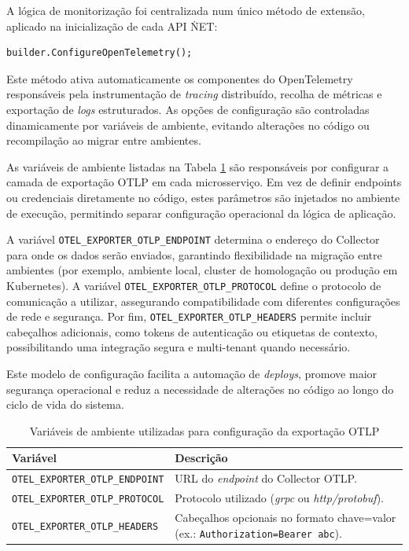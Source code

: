 A lógica de monitorização foi centralizada num único método de extensão, aplicado na inicialização de cada API \.NET:

\begin{verbatim}
builder.ConfigureOpenTelemetry();
\end{verbatim}

Este método ativa automaticamente os componentes do OpenTelemetry responsáveis pela instrumentação de \textit{tracing} distribuído, recolha de métricas e exportação de \textit{logs} estruturados. As opções de configuração são controladas dinamicamente por variáveis de ambiente, evitando alterações no código ou recompilação ao migrar entre ambientes.


As variáveis de ambiente listadas na Tabela \ref{tab:otel_env_vars} são responsáveis por configurar a camada de exportação OTLP em cada microsserviço. Em vez de definir endpoints ou credenciais diretamente no código, estes parâmetros são injetados no ambiente de execução, permitindo separar configuração operacional da lógica de aplicação.

A variável \texttt{OTEL\_EXPORTER\_OTLP\_ENDPOINT} determina o endereço do Collector para onde os dados serão enviados, garantindo flexibilidade na migração entre ambientes (por exemplo, ambiente local, cluster de homologação ou produção em Kubernetes). A variável \texttt{OTEL\_EXPORTER\_OTLP\_PROTOCOL} define o protocolo de comunicação a utilizar, assegurando compatibilidade com diferentes configurações de rede e segurança. Por fim, \texttt{OTEL\_EXPORTER\_OTLP\_HEADERS} permite incluir cabeçalhos adicionais, como tokens de autenticação ou etiquetas de contexto, possibilitando uma integração segura e multi-tenant quando necessário.

Este modelo de configuração facilita a automação de \textit{deploys}, promove maior segurança operacional e reduz a necessidade de alterações no código ao longo do ciclo de vida do sistema.


\begin{table}[H]
\centering
\begin{tabular}{|p{6cm}|p{8cm}|}
\hline
\textbf{Variável} & \textbf{Descrição} \\ \hline
\texttt{OTEL\_EXPORTER\_OTLP\_ENDPOINT} & URL do \textit{endpoint} do Collector OTLP. \\ \hline
\texttt{OTEL\_EXPORTER\_OTLP\_PROTOCOL} & Protocolo utilizado (\textit{grpc} ou \textit{http/protobuf}). \\ \hline
\texttt{OTEL\_EXPORTER\_OTLP\_HEADERS} & Cabeçalhos opcionais no formato chave=valor (ex.: \texttt{Authorization=Bearer abc}). \\ \hline
\end{tabular}
\caption{Variáveis de ambiente utilizadas para configuração da exportação OTLP}
\label{tab:otel_env_vars}
\end{table}


